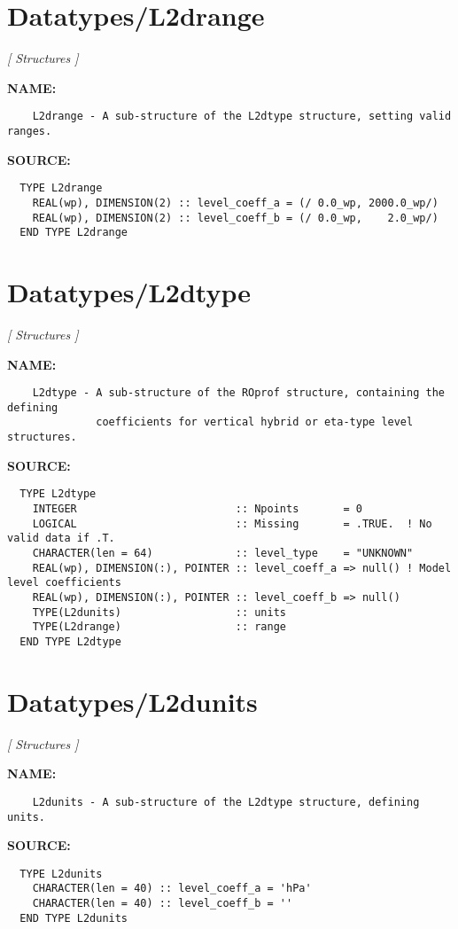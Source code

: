 \section{Datatypes/L2drange}
\textsl{[ Structures ]}

\label{ch:robo48}
\label{ch:Datatypes_L2drange}
\textbf{NAME:}\hspace{0.08in}\begin{Verbatim}
    L2drange - A sub-structure of the L2dtype structure, setting valid ranges.
\end{Verbatim}
\textbf{SOURCE:}\hspace{0.08in}\begin{Verbatim}
  TYPE L2drange
    REAL(wp), DIMENSION(2) :: level_coeff_a = (/ 0.0_wp, 2000.0_wp/)
    REAL(wp), DIMENSION(2) :: level_coeff_b = (/ 0.0_wp,    2.0_wp/)
  END TYPE L2drange
\end{Verbatim}
\section{Datatypes/L2dtype}
\textsl{[ Structures ]}

\label{ch:robo49}
\label{ch:Datatypes_L2dtype}
\textbf{NAME:}\hspace{0.08in}\begin{Verbatim}
    L2dtype - A sub-structure of the ROprof structure, containing the defining
              coefficients for vertical hybrid or eta-type level structures.
\end{Verbatim}
\textbf{SOURCE:}\hspace{0.08in}\begin{Verbatim}
  TYPE L2dtype
    INTEGER                         :: Npoints       = 0
    LOGICAL                         :: Missing       = .TRUE.  ! No valid data if .T.
    CHARACTER(len = 64)             :: level_type    = "UNKNOWN"
    REAL(wp), DIMENSION(:), POINTER :: level_coeff_a => null() ! Model level coefficients
    REAL(wp), DIMENSION(:), POINTER :: level_coeff_b => null()
    TYPE(L2dunits)                  :: units
    TYPE(L2drange)                  :: range
  END TYPE L2dtype
\end{Verbatim}
\section{Datatypes/L2dunits}
\textsl{[ Structures ]}

\label{ch:robo50}
\label{ch:Datatypes_L2dunits}
\textbf{NAME:}\hspace{0.08in}\begin{Verbatim}
    L2dunits - A sub-structure of the L2dtype structure, defining units.
\end{Verbatim}
\textbf{SOURCE:}\hspace{0.08in}\begin{Verbatim}
  TYPE L2dunits
    CHARACTER(len = 40) :: level_coeff_a = 'hPa'
    CHARACTER(len = 40) :: level_coeff_b = ''
  END TYPE L2dunits
\end{Verbatim}
